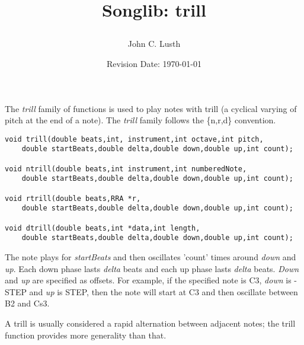 \documentclass{article}
\title{Songlib: trill\\
\date{Revision Date: \today}}
\author{John C. Lusth}
\begin{document}
\maketitle

\W\subsubsection*{}
\W\htmlrule

The {\it trill} family of functions is used to play notes
with trill (a cyclical varying of pitch at the end
of a note). The {\it trill} family follows the \{n,r,d\} convention.

\begin{verbatim}
void trill(double beats,int, instrument,int octave,int pitch,
    double startBeats,double delta,double down,double up,int count);

void ntrill(double beats,int instrument,int numberedNote,
    double startBeats,double delta,double down,double up,int count);

void rtrill(double beats,RRA *r,
    double startBeats,double delta,double down,double up,int count);

void dtrill(double beats,int *data,int length,
    double startBeats,double delta,double down,double up,int count);
\end{verbatim}

The note plays for {\it startBeats} and then oscillates 'count' times
around {\it down} and {\it up}.  Each down phase lasts {\it delta} beats and
each up phase lasts {\it delta} beats.
{\it Down} and {\it up} are specified as offsets.
For example, if the specified note is C3,
{\it down} is -STEP and {\it up} is STEP,
then the note will start at C3 and then oscillate between B2 and Cs3.

A trill is usually considered a rapid alternation between
adjacent notes; the trill function provides more generality
than that.
\end{document}
